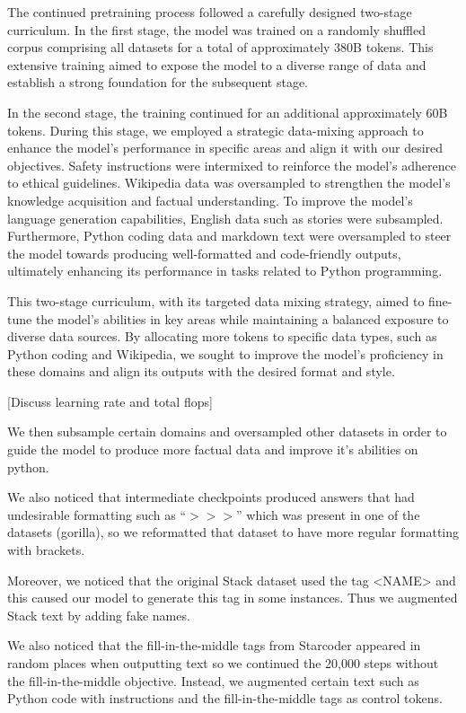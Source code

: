 \iffalse
The continued pretraining process followed a carefully designed two-stage curriculum. In the first stage, the model was trained on a randomly shuffled corpus comprising all datasets for a total of approximately 380B tokens. This extensive training aimed to expose the model to a diverse range of data and establish a strong foundation for the subsequent stage.

In the second stage, the training continued for an additional approximately 60B tokens. During this stage, we employed a strategic data-mixing approach to enhance the model's performance in specific areas and align it with our desired objectives. Safety instructions were intermixed to reinforce the model's adherence to ethical guidelines. Wikipedia data was oversampled to strengthen the model's knowledge acquisition and factual understanding. To improve the model's language generation capabilities, English data such as stories were subsampled. Furthermore, Python coding data and markdown text were oversampled to steer the model towards producing well-formatted and code-friendly outputs, ultimately enhancing its performance in tasks related to Python programming.

This two-stage curriculum, with its targeted data mixing strategy, aimed to fine-tune the model's abilities in key areas while maintaining a balanced exposure to diverse data sources. By allocating more tokens to specific data types, such as Python coding and Wikipedia, we sought to improve the model's proficiency in these domains and align its outputs with the desired format and style.

[Discuss learning rate and total flops]

We then subsample certain domains and oversampled other datasets in order to guide the model to produce more factual data and improve it’s abilities on python.

We also noticed that intermediate checkpoints produced answers that had undesirable formatting such as “$>>>$” which was present in one of the datasets (gorilla), so we reformatted that dataset to have more regular formatting with brackets. 

Moreover, we noticed that the original Stack dataset used the tag <NAME> and this caused our model to generate this tag in some instances. Thus we augmented Stack text by adding fake names.

We also noticed that the fill-in-the-middle tags from Starcoder appeared in random places when outputting text so we continued the 20,000 steps without the fill-in-the-middle objective. Instead, we augmented certain text such as Python code with instructions and the fill-in-the-middle tags as control tokens.

